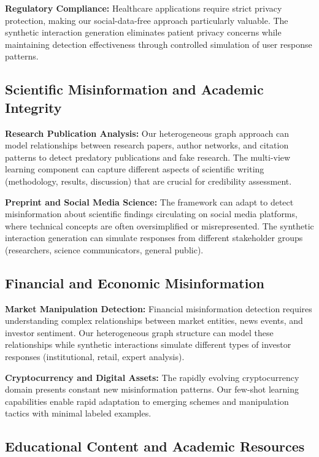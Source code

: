 \textbf{Regulatory Compliance:} Healthcare applications require strict privacy protection, making our social-data-free approach particularly valuable. The synthetic interaction generation eliminates patient privacy concerns while maintaining detection effectiveness through controlled simulation of user response patterns.

\subsection{Scientific Misinformation and Academic Integrity}

\textbf{Research Publication Analysis:} Our heterogeneous graph approach can model relationships between research papers, author networks, and citation patterns to detect predatory publications and fake research. The multi-view learning component can capture different aspects of scientific writing (methodology, results, discussion) that are crucial for credibility assessment.

\textbf{Preprint and Social Media Science:} The framework can adapt to detect misinformation about scientific findings circulating on social media platforms, where technical concepts are often oversimplified or misrepresented. The synthetic interaction generation can simulate responses from different stakeholder groups (researchers, science communicators, general public).

\subsection{Financial and Economic Misinformation}

\textbf{Market Manipulation Detection:} Financial misinformation detection requires understanding complex relationships between market entities, news events, and investor sentiment. Our heterogeneous graph structure can model these relationships while synthetic interactions simulate different types of investor responses (institutional, retail, expert analysis).

\textbf{Cryptocurrency and Digital Assets:} The rapidly evolving cryptocurrency domain presents constant new misinformation patterns. Our few-shot learning capabilities enable rapid adaptation to emerging schemes and manipulation tactics with minimal labeled examples.

\subsection{Educational Content and Academic Resources}

